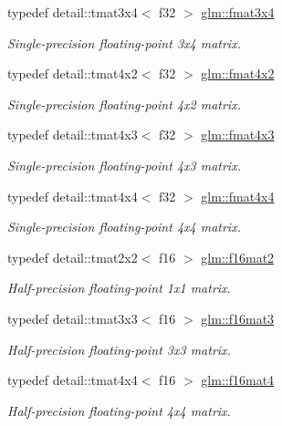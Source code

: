 \begin{DoxyCompactItemize}
typedef detail\-::tmat3x4$<$ f32 $>$ \hyperlink{group__gtc__type__precision_ga25970f79d7650ec2d422119fe1e56c3f}{glm\-::fmat3x4}
\begin{DoxyCompactList}\small\item\em Single-\/precision floating-\/point 3x4 matrix. \end{DoxyCompactList}\item 
typedef detail\-::tmat4x2$<$ f32 $>$ \hyperlink{group__gtc__type__precision_ga532054b5f4c6f8cadec059d83e188104}{glm\-::fmat4x2}
\begin{DoxyCompactList}\small\item\em Single-\/precision floating-\/point 4x2 matrix. \end{DoxyCompactList}\item 
typedef detail\-::tmat4x3$<$ f32 $>$ \hyperlink{group__gtc__type__precision_ga55d2df2d8b1b94d495125530fac1da69}{glm\-::fmat4x3}
\begin{DoxyCompactList}\small\item\em Single-\/precision floating-\/point 4x3 matrix. \end{DoxyCompactList}\item 
typedef detail\-::tmat4x4$<$ f32 $>$ \hyperlink{group__gtc__type__precision_gad011717dba7e15802233b335618d8969}{glm\-::fmat4x4}
\begin{DoxyCompactList}\small\item\em Single-\/precision floating-\/point 4x4 matrix. \end{DoxyCompactList}\item 
typedef detail\-::tmat2x2$<$ f16 $>$ \hyperlink{group__gtc__type__precision_gaa0e6cf15c6bf4136f596ed129a55ae6b}{glm\-::f16mat2}
\begin{DoxyCompactList}\small\item\em Half-\/precision floating-\/point 1x1 matrix. \end{DoxyCompactList}\item 
typedef detail\-::tmat3x3$<$ f16 $>$ \hyperlink{group__gtc__type__precision_ga565f29588755e09a686049d0f0c91af5}{glm\-::f16mat3}
\begin{DoxyCompactList}\small\item\em Half-\/precision floating-\/point 3x3 matrix. \end{DoxyCompactList}\item 
typedef detail\-::tmat4x4$<$ f16 $>$ \hyperlink{group__gtc__type__precision_gab8417233c8f428e6e46bf77c7fc11200}{glm\-::f16mat4}
\begin{DoxyCompactList}\small\item\em Half-\/precision floating-\/point 4x4 matrix. \end{DoxyCompactList}\item 

\end{DoxyCompactItemize}
